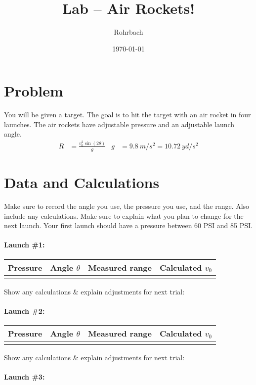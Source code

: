 \documentclass[10pt]{exam}
\title{Lab -- Air Rockets!}
\author{Rohrbach}
\date{\today}
\begin{document}
\maketitle

\section*{Problem} You will be given a target.  The goal is to hit the target with an air rocket in four launches. The air rockets have adjustable pressure and an adjustable launch angle.
%
\begin{align*}
  R &= \frac{v_0^2\sin\left(2\theta\right)}{g} &
  g &= \SI{9.8}{m/s^2} = \SI{10.72}{yd/s^2}
\end{align*}


\section*{Data and Calculations} Make sure to record the angle you use, the pressure you use, and the range.  Also include any calculations.  Make sure to explain what you plan to change for the next launch.  Your first launch should have a pressure between 60 PSI and 85 PSI.

\newcommand{\datatable}{
  \begin{tabular}{|c|c|c|c|}
    \hline
    Pressure & Angle $\theta$ & Measured range & Calculated $v_0$ \\\hline
            &                &                &                  \\[1em]
    \hline
  \end{tabular}
  
  \vspace{0.4em}

  
  {\small Show any calculations \& explain adjustments for next trial:}
}

\paragraph{Launch \#1:}\hfill

\datatable
\vs

\paragraph{Launch \#2:}\hfill

\datatable
\vs

\paragraph{Launch \#3:}\hfill
\end{document}
